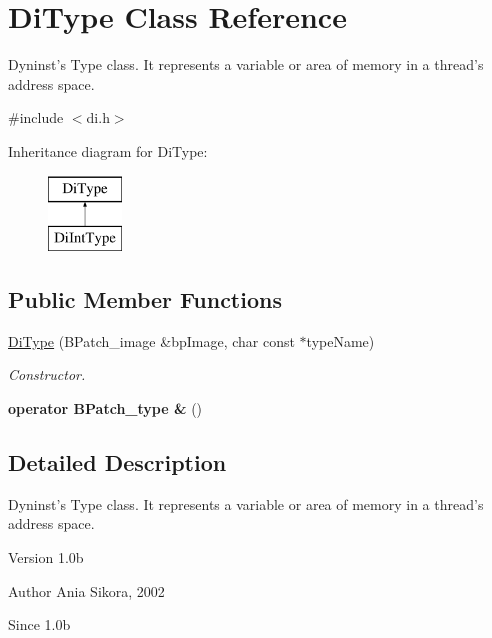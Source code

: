 \hypertarget{class_di_type}{\section{Di\-Type Class Reference}
\label{class_di_type}
}


Dyninst's Type class. It represents a variable or area of memory in a thread's address space.  




{\ttfamily \#include $<$di.\-h$>$}

Inheritance diagram for Di\-Type\-:\begin{figure}[H]
\begin{center}
\leavevmode
\includegraphics[height=2.000000cm]{class_di_type}
\end{center}
\end{figure}
\subsection*{Public Member Functions}
\begin{DoxyCompactItemize}
\item 
\hyperlink{class_di_type_a8a7f7ce0cd5dbec8798ce3409ff3b01f}{Di\-Type} (B\-Patch\-\_\-image \&bp\-Image, char const $\ast$type\-Name)
\begin{DoxyCompactList}\small\item\em Constructor. \end{DoxyCompactList}\item 
\hypertarget{class_di_type_a76e679b9df26668087c02531ab1f6c54}{{\bfseries operator B\-Patch\-\_\-type \&} ()}\label{class_di_type_a76e679b9df26668087c02531ab1f6c54}

\end{DoxyCompactItemize}


\subsection{Detailed Description}
Dyninst's Type class. It represents a variable or area of memory in a thread's address space. 

\begin{DoxyVersion}{Version}
1.\-0b 
\end{DoxyVersion}
\begin{DoxyAuthor}{Author}
Ania Sikora, 2002 
\end{DoxyAuthor}
\begin{DoxySince}{Since}
1.\-0b 
\end{DoxySince}


